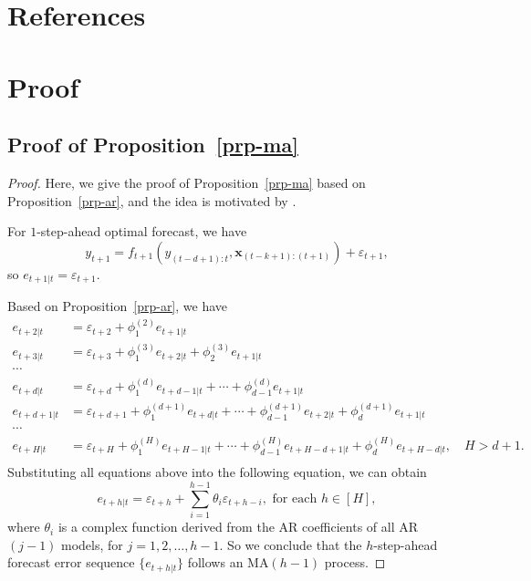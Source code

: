 \documentclass[
  11pt,
  a4paper,
]{article}
\theoremstyle{plain}
\theoremstyle{remark}
\begin{document}
\section*{References}\label{references}

\printbibliography[heading=none]

\newpage
\appendix
\setcounter{section}{0}
\renewcommand{\thesection}{Appendix \Alph{section}}
\renewcommand{\thesubsection}{\Alph{section}.\arabic{subsection}}
\renewcommand{\thefigure}{A\arabic{figure}}
\renewcommand{\thetable}{A\arabic{table}}
\setcounter{figure}{0}
\setcounter{table}{0}

\section{Proof}\label{sec-proof}

\subsection{\texorpdfstring{Proof of
Proposition~\ref{prp-ma}}{Proof of Proposition~}}\label{sec-proof_ma}

\begin{proof}
Here, we give the proof of Proposition~\ref{prp-ma} based on
Proposition~\ref{prp-ar}, and the idea is motivated by
\textcite{sommer2023}.

For \(1\)-step-ahead optimal forecast, we have \[
y_{t+1} = f_{t+1}(y_{(t-d+1):t},\bm{x}_{(t-k+1):(t+1)}) + \varepsilon_{t+1},
\] so \(e_{t+1|t}=\varepsilon_{t+1}\).

Based on Proposition~\ref{prp-ar}, we have \[
\begin{aligned}
e_{t+2|t} &= \varepsilon_{t+2} + \phi_{1}^{(2)}e_{t+1|t} \\
e_{t+3|t} &= \varepsilon_{t+3} + \phi_{1}^{(3)}e_{t+2|t} + \phi_{2}^{(3)}e_{t+1|t} \\
\cdots \\
e_{t+d|t} &= \varepsilon_{t+d} + \phi_{1}^{(d)}e_{t+d-1|t} + \cdots + \phi_{d-1}^{(d)}e_{t+1|t} \\
e_{t+d+1|t} &= \varepsilon_{t+d+1} + \phi_{1}^{(d+1)}e_{t+d|t} + \cdots + \phi_{d-1}^{(d+1)}e_{t+2|t} + \phi_{d}^{(d+1)}e_{t+1|t} \\
\cdots \\
e_{t+H|t} &= \varepsilon_{t+H} + \phi_{1}^{(H)}e_{t+H-1|t} + \cdots + \phi_{d-1}^{(H)}e_{t+H-d+1|t} + \phi_{d}^{(H)}e_{t+H-d|t}, \quad H > d + 1. \\
\end{aligned}
\] Substituting all equations above into the following equation, we can
obtain \[
e_{t+h|t} = \varepsilon_{t+h} + \sum_{i=1}^{h-1}\theta_{i}\varepsilon_{t+h-i}, \text{ for each } h\in[H],
\] where \(\theta_{i}\) is a complex function derived from the AR
coefficients of all AR\((j-1)\) models, for \(j = 1,2,\ldots,h-1\). So
we conclude that the \(h\)-step-ahead forecast error sequence
\(\{e_{t+h|t}\}\) follows an MA\((h-1)\) process.
\end{proof}
\end{document}
